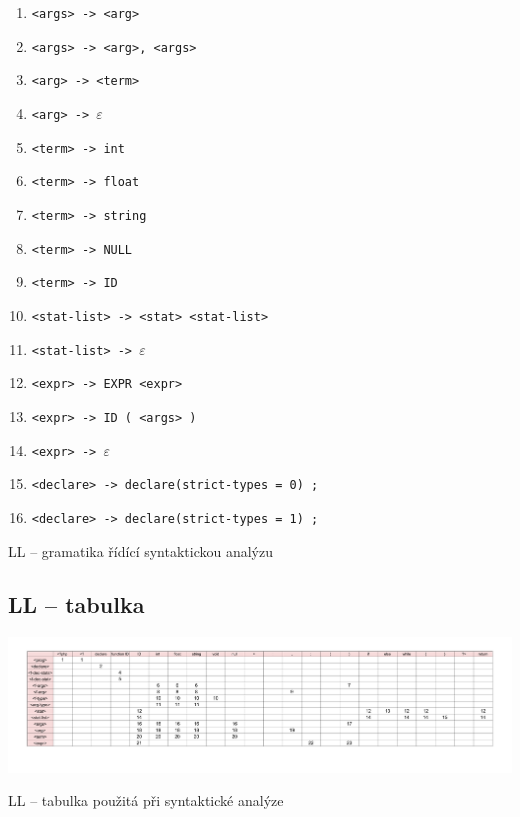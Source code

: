 \documentclass[a4paper, 11pt]{article}
\begin{document}
\begin{table}[!ht]
\begin{enumerate}[noitemsep]
			\item \verb|<args> -> <arg>|
			\item \verb|<args> -> <arg>, <args>|
			\item \verb|<arg> -> <term>|
			\item \verb|<arg> -> |$\varepsilon$

			\item \verb|<term> -> int|
			\item \verb|<term> -> float|
			\item \verb|<term> -> string|
			\item \verb|<term> -> NULL|
			\item \verb|<term> -> ID|

			\item \verb|<stat-list> -> <stat> <stat-list>|
			\item \verb|<stat-list> -> |$\varepsilon$

			\item \verb|<expr> -> EXPR <expr>|
			\item \verb|<expr> -> ID ( <args> )|
			\item \verb|<expr> -> |$\varepsilon$

			\item \verb|<declare> -> declare(strict-types = 0) ;|
			\item \verb|<declare> -> declare(strict-types = 1) ;|

		\end{enumerate}

		\caption{LL -- gramatika řídící syntaktickou analýzu}
		\label{table:ll_gramatika}
	\end{table}

    \newpage
    \thispagestyle{empty}
    \begin{landscape}
	\section{LL -- tabulka}
	\begin{table}[!ht]
		\centering
		\includegraphics[width=1\linewidth]{LL grammar.pdf}
		\caption{LL -- tabulka použitá při syntaktické analýze}
		\label{table:ll_table}
	\end{table}
    \end{landscape}
\end{document}
